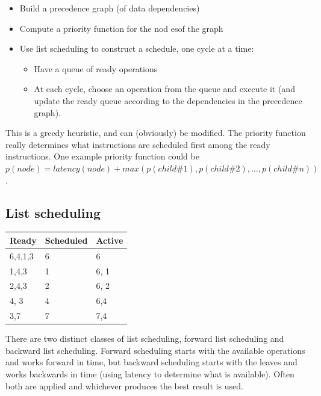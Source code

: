 \begin{itemize}
        \item Build a precedence graph (of data dependencies)
        \item Compute a priority function for the nod esof the graph
        \item Use list scheduling to construct a schedule, one cycle at a time:
        \begin{itemize}
        \item Have a queue of ready operations
        \item At each cycle, choose an operation from the queue and execute
        it (and update the ready queue according to the dependencies in the precedence graph).
        \end{itemize}
\end{itemize}

This is a greedy heuristic, and can (obviously) be modified. The
priority function really determines what instructions are scheduled
first among the ready instructions. One example priority function
could be $p(node) = latency(node) + max(p(child\#1), p(child\#2),
\dots, p(child\#n))$.


\subsection{List scheduling}


\begin{tabular}{lll}
Ready & Scheduled & Active\\ \hline
6,4,1,3 & 6 & 6\\ \hline
1,4,3 & 1 & 6, 1\\ \hline
2,4,3 & 2 & 6, 2\\ \hline
4, 3 & 4 & 6,4\\ \hline
3,7 & 7 & 7,4 \\ \hline
\end{tabular}

There are two distinct classes of list scheduling, forward list
scheduling and backward list scheduling. Forward scheduling starts
with the available operations and works forward in time, but backward
scheduling starts with the leaves and works backwards in time (using
latency to determine what is available). Often both are applied and
whichever produces the best result is used.

